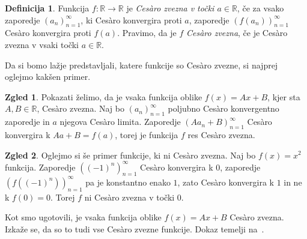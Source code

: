 \documentclass[a4paper,12pt]{article}
\theoremstyle{definition}
\newtheorem{definicija}{Definicija}
\newtheorem{zgled}{Zgled}
\theoremstyle{plain}
\begin{document}
\begin{definicija}
    Funkcija $f: \mathbb{R} \rightarrow \mathbb{R}$ je \emph{Ces\`{a}ro zvezna v točki $a \in \mathbb{R}$}, če za vsako zaporedje $(a_n)_{n=1}^{\infty}$, ki Ces\`{a}ro konvergira proti $a$, zaporedje $(f(a_n))_{n=1}^{\infty}$ Ces\`{a}ro konvergira proti $f(a)$. Pravimo, da je $f$ \emph{Ces\`{a}ro zvezna}, če je Ces\`{a}ro zvezna v vsaki točki $a \in \mathbb{R}$.
\end{definicija}

Da si bomo lažje predstavljali, katere funkcije so Ces\`{a}ro zvezne, si najprej oglejmo kakšen primer.

\begin{zgled}
    \label{vsezvez}
    Pokazati želimo, da je vsaka funkcija oblike $f(x) = Ax + B$, kjer sta $A, B \in \mathbb{R}$, Ces\`{a}ro zvezna. Naj bo $(a_n)_{n=1}^{\infty}$ poljubno Ces\`{a}ro konvergentno zaporedje in $a$ njegova Ces\`{a}ro limita. Zaporedje $(A a_n + B)_{n=1}^{\infty}$ Ces\`{a}ro konvergira k $A a + B = f(a)$, torej je funkcija $f$ res Ces\`{a}ro zvezna.
\end{zgled}

\begin{zgled}
    Oglejmo si še primer funkcije, ki ni Ces\`{a}ro zvezna. Naj bo $f(x) = x^2$ funkcija. Zaporedje $((-1)^n)_{n=1}^{\infty}$ Ces\`{a}ro konvergira k $0$, zaporedje $(f((-1)^n))_{n=1}^{\infty}$ pa je konstantno enako $1$, zato Ces\`{a}ro konvergira k $1$ in ne k $f(0) = 0$. Torej $f$ ni Ces\`{a}ro zvezna v točki $0$.
\end{zgled}

Kot smo ugotovili, je vsaka funkcija oblike $f(x) = Ax + B$ Ces\`{a}ro zvezna. Izkaže se, da so to tudi vse Ces\`{a}ro zvezne funkcije. Dokaz temelji na~\cite[stran 247--248]{2}.
\end{document}
